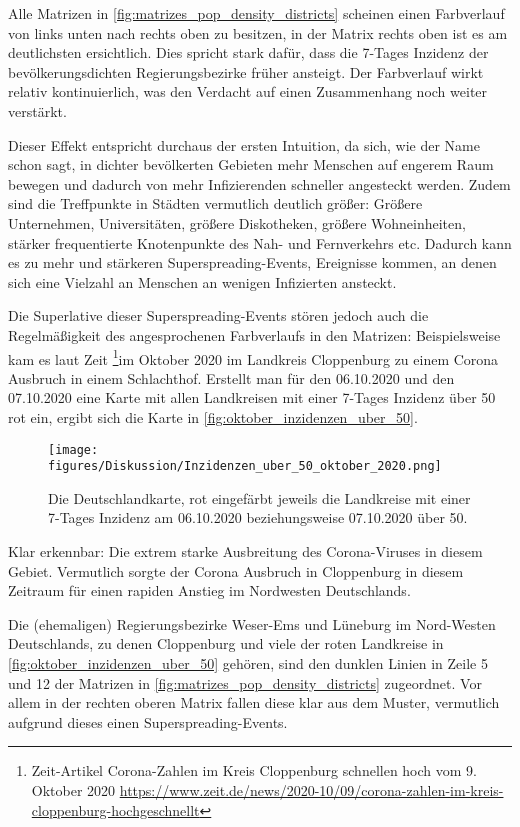 Alle Matrizen in \autoref{fig:matrizes_pop_density_districts} scheinen einen Farbverlauf von links unten nach rechts oben zu besitzen, in der Matrix rechts oben ist es am deutlichsten ersichtlich. Dies spricht stark dafür, dass die 7-Tages Inzidenz der bevölkerungsdichten Regierungsbezirke früher ansteigt. Der Farbverlauf wirkt relativ kontinuierlich, was den Verdacht auf einen Zusammenhang noch weiter verstärkt.

Dieser Effekt entspricht durchaus der ersten Intuition, da sich, wie der Name schon sagt, in dichter bevölkerten Gebieten mehr Menschen auf engerem Raum bewegen und dadurch von mehr Infizierenden schneller angesteckt werden.
Zudem sind die Treffpunkte in Städten vermutlich deutlich größer: Größere Unternehmen, Universitäten, größere Diskotheken, größere Wohneinheiten, stärker frequentierte Knotenpunkte des Nah- und Fernverkehrs etc. Dadurch kann es zu mehr und stärkeren Superspreading-Events, Ereignisse kommen, an denen sich eine Vielzahl an Menschen an wenigen Infizierten ansteckt.

Die Superlative dieser Superspreading-Events stören jedoch auch die Regelmäßigkeit des angesprochenen Farbverlaufs in den Matrizen: Beispielsweise kam es laut Zeit \footnote{
Zeit-Artikel \glqq{}Corona-Zahlen im Kreis Cloppenburg schnellen hoch\grqq{} vom 9. Oktober 2020
\href{https://www.zeit.de/news/2020-10/09/corona-zahlen-im-kreis-cloppenburg-hochgeschnellt}{
https://www.zeit.de/news/2020-10/09/corona-zahlen-im-kreis-cloppenburg-hochgeschnellt}}im Oktober 2020 im Landkreis Cloppenburg zu einem Corona Ausbruch in einem Schlachthof. Erstellt man für den 06.10.2020 und den 07.10.2020 eine Karte mit allen Landkreisen mit einer 7-Tages Inzidenz über 50 rot ein, ergibt sich die Karte in \autoref{fig:oktober_inzidenzen_uber_50}.

\begin{figure}[H]
    \centering
    \texttt{[image: figures/Diskussion/Inzidenzen\_uber\_50\_oktober\_2020.png]}
    \caption{Die Deutschlandkarte, rot eingefärbt jeweils die Landkreise mit einer 7-Tages Inzidenz am 06.10.2020 beziehungsweise 07.10.2020 über 50.}
    \label{fig:oktober_inzidenzen_uber_50}
\end{figure}
Klar erkennbar: Die extrem starke Ausbreitung des Corona-Viruses in diesem Gebiet. Vermutlich sorgte der Corona Ausbruch in Cloppenburg in diesem Zeitraum für einen rapiden Anstieg im Nordwesten Deutschlands.

Die (ehemaligen) Regierungsbezirke Weser-Ems und Lüneburg im Nord-Westen Deutschlands, zu denen Cloppenburg und viele der roten Landkreise in \autoref{fig:oktober_inzidenzen_uber_50} gehören, sind den dunklen Linien in Zeile 5 und 12 der Matrizen in \autoref{fig:matrizes_pop_density_districts} zugeordnet. Vor allem in der rechten oberen Matrix fallen diese klar aus dem Muster, vermutlich aufgrund dieses einen Superspreading-Events.

